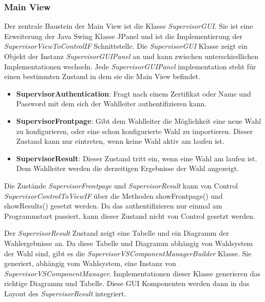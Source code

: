 \documentclass[parskip=full]{scrartcl}
\newcommand{\fakeparagraph}[1]{\textbf{#1}}
\begin{document}
		\subsubsection{Main View}
		Der zentrale Baustein der Main View ist die Klasse \textit{SupervisorGUI}. Sie ist eine Erweiterung der Java Swing Klasse JPanel und ist die Implementierung der \textit{SupervisorViewToControlIF} Schnittstelle. Die \textit{SupervisorGUI} Klasse zeigt ein Objekt der Instanz \textit{SupervisorGUIPanel} an und kann zwischen unterschiedlichen Implementationen wechseln. Jede \textit{SupervisorGUIPanel} implementation steht für einen bestimmten Zustand in dem sie die Main View befindet.
		\begin{itemize}
			\item\fakeparagraph{SupervisorAuthentication}: Fragt nach einem Zertifikat oder Name und Password mit dem sich der Wahlleiter authentifizieren kann.
			\item\fakeparagraph{SupervisorFrontpage}: Gibt dem Wahlleiter die Möglichkeit eine neue Wahl zu konfigurieren, oder eine schon konfigurierte Wahl zu importieren. Dieser Zustand kann nur eintreten, wenn keine Wahl aktiv am laufen ist.
			\item\fakeparagraph{SupervisorResult}: Dieser Zustand tritt ein, wenn eine Wahl am laufen ist. Dem Wahlleiter werden die derzeitigen Ergebnisse der Wahl angezeigt.
		\end{itemize}
	
		Die Zustände \textit{SupervisorFrontpage} und \textit{SupervisorResult} kann von Control \textit{SupervisorControlToViewIF} über die Methoden showFrontpage() und showResults() gesetzt werden. Da das authentifizieren nur einmal am Programmstart passiert, kann dieser Zustand nicht von Control gesetzt werden.
		
		Der \textit{SupervisorResult} Zustand zeigt eine Tabelle und ein Diagramm der Wahlergebnisse an. Da diese Tabelle und Diagramm abhängig von Wahlsystem der Wahl sind, gibt es die \textit{SupervisorVSComponentManagerBuilder} Klasse. Sie generiert, abhängig vom Wahlsystem, eine Instanz von \textit{SupervisorVSComponentManager}. Implementationen dieser Klasse generieren das richtige Diagramm und Tabelle. Diese GUI Komponenten werden dann in das Layout des \textit{SupervisorResult} integriert.
		
\end{document}
